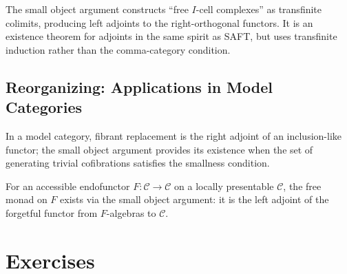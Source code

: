 \begin{remark}
The small object argument constructs ``free $I$-cell complexes'' as
transfinite colimits, producing left adjoints to the right-orthogonal
functors. It is an existence theorem for adjoints in the same spirit as
SAFT, but uses transfinite induction rather than the comma-category
condition.
\end{remark}

\subsection{Reorganizing: Applications in Model Categories}

\begin{example_thm}
In a model category, fibrant replacement is the right adjoint of an
inclusion-like functor; the small object argument provides its existence
when the set of generating trivial cofibrations satisfies the smallness
condition.
\end{example_thm}

\begin{example_thm}
For an accessible endofunctor $F : \mathcal{C} \to \mathcal{C}$ on a locally
presentable $\mathcal{C}$, the free monad on $F$ exists via the small object
argument: it is the left adjoint of the forgetful functor from $F$-algebras
to $\mathcal{C}$.
\end{example_thm}


\section{Exercises}
\label{sec:aft-unified-exercises}

